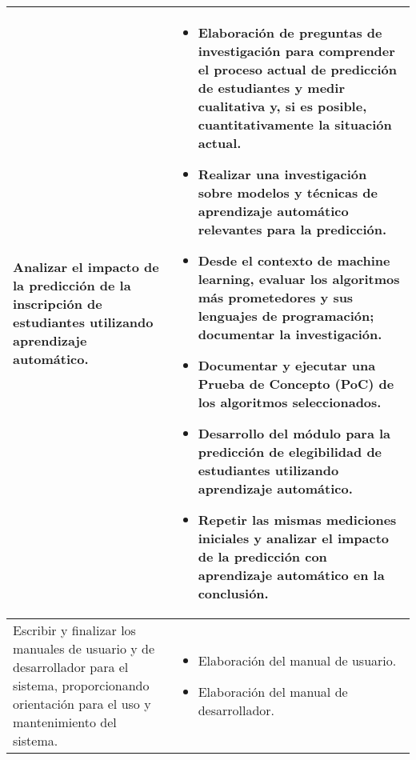 \begin{longtable}{p{3in}|p{3in}}
Analizar el impacto de la predicción de la inscripción de estudiantes utilizando aprendizaje automático. &
\begin{itemize}
	\item Elaboración de preguntas de investigación para comprender el proceso actual de predicción de estudiantes y medir cualitativa y, si es posible, cuantitativamente la situación actual.
    \item Realizar una investigación sobre modelos y técnicas de aprendizaje automático relevantes para la predicción.
    \item Desde el contexto de machine learning, evaluar los algoritmos más prometedores y sus lenguajes de programación; documentar la investigación.
    \item Documentar y ejecutar una Prueba de Concepto (PoC) de los algoritmos seleccionados.
	\item Desarrollo del módulo para la predicción de elegibilidad de estudiantes utilizando aprendizaje automático.
	\item Repetir las mismas mediciones iniciales y analizar el impacto de la predicción con aprendizaje automático en la conclusión.
\end{itemize}
\\\hline

Escribir y finalizar los manuales de usuario y de desarrollador para el sistema, proporcionando orientación para el uso y mantenimiento del sistema. &
\begin{itemize}
    \item Elaboración del manual de usuario.
    \item Elaboración del manual de desarrollador.
\end{itemize}
\\\hline
\end{longtable}
